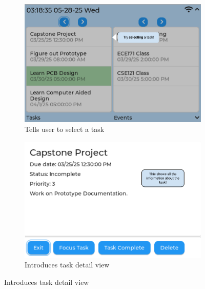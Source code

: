 \begin{figure}[h]
\begin{subfigure}{0.5\textwidth}
    \end{subfigure}
    \begin{subfigure}{0.5\textwidth}
        \includegraphics[width = \textwidth]{task_select.png}
        \caption{Tells user to select a task}
    \end{subfigure}
    \begin{subfigure}{0.5\textwidth}
        \includegraphics[width = \textwidth]{task_detail.png}
        \caption{Introduces task detail view}
    \end{subfigure}


\end{figure}
